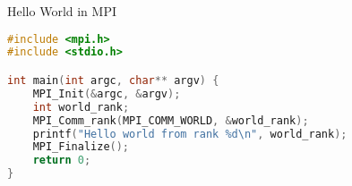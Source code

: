 \begin{frame}[fragile]{Hello World in MPI}
\begin{lstlisting}[language=C, basicstyle=\small\ttfamily, keywordstyle=\color{blue}]
#include <mpi.h>
#include <stdio.h>

int main(int argc, char** argv) {
    MPI_Init(&argc, &argv);
    int world_rank;
    MPI_Comm_rank(MPI_COMM_WORLD, &world_rank);
    printf("Hello world from rank %d\n", world_rank);
    MPI_Finalize();
    return 0;
}
\end{lstlisting}
\label{lst:mpi_hello_world} 
\end{frame}
